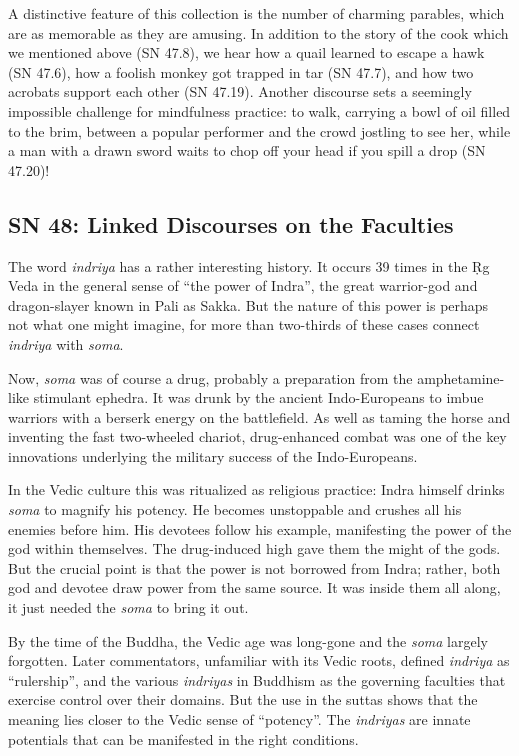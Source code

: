 \documentclass[12pt,openany]{book}%
\begin{document}
A distinctive feature of this collection is the number of charming parables, which are as memorable as they are amusing. In addition to the story of the cook which we mentioned above (SN 47.8), we hear how a quail learned to escape a hawk (SN 47.6), how a foolish monkey got trapped in tar (SN 47.7), and how two acrobats support each other (SN 47.19). Another discourse sets a seemingly impossible challenge for mindfulness practice: to walk, carrying a bowl of oil filled to the brim, between a popular performer and the crowd jostling to see her, while a man with a drawn sword waits to chop off your head if you spill a drop (SN 47.20)!

\subsection*{SN 48: Linked Discourses on the Faculties}

The word \textit{indriya} has a rather interesting history. It occurs 39 times in the Ṛg Veda in the general sense of “the power of Indra”, the great warrior-god and dragon-slayer known in Pali as Sakka. But the nature of this power is perhaps not what one might imagine, for more than two-thirds of these cases connect \textit{indriya} with \textit{soma}.

Now, \textit{soma} was of course a drug, probably a preparation from the amphetamine-like stimulant ephedra. It was drunk by the ancient Indo-Europeans to imbue warriors with a berserk energy on the battlefield. As well as taming the horse and inventing the fast two-wheeled chariot, drug-enhanced combat was one of the key innovations underlying the military success of the Indo-Europeans.

In the Vedic culture this was ritualized as religious practice: Indra himself drinks \textit{soma} to magnify his potency. He becomes unstoppable and crushes all his enemies before him. His devotees follow his example, manifesting the power of the god within themselves. The drug-induced high gave them the might of the gods. But the crucial point is that the power is not borrowed from Indra; rather, both god and devotee draw power from the same source. It was inside them all along, it just needed the \textit{soma} to bring it out.

By the time of the Buddha, the Vedic age was long-gone and the \textit{soma} largely forgotten. Later commentators, unfamiliar with its Vedic roots, defined \textit{indriya} as “rulership”, and the various \textit{indriyas} in Buddhism as the governing faculties that exercise control over their domains. But the use in the suttas shows that the meaning lies closer to the Vedic sense of “potency”. The \textit{indriyas} are innate potentials that can be manifested in the right conditions.
\end{document}
